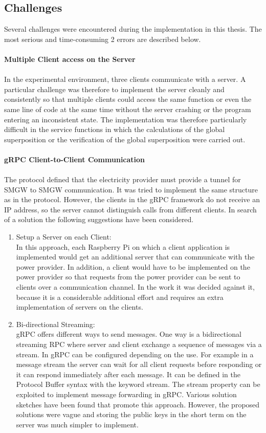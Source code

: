 \subsection{Challenges}
Several challenges were encountered during the implementation in this thesis. The most serious and time-consuming 2 errors are described below.\\
\\
\textbf{Multiple Client access on the Server}
\\
\\ 
In the experimental environment, three clients communicate with a server. A particular challenge was therefore to implement the server cleanly and consistently so that multiple clients could access the same function or even the same line of code at the same time without the server crashing or the program entering an inconsistent state. The implementation was therefore particularly difficult in the service functions in which the calculations of the global superposition or the verification of the global superposition were carried out.%
\\
\\
\textbf{gRPC Client-to-Client Communication}
\\
\\
The protocol defined that the electricity provider must provide a tunnel for SMGW to SMGW communication. It was tried to implement the same structure as in the protocol. However, the clients in the gRPC framework do not receive an IP address, so the server cannot distinguish calls from different clients. In search of a solution the following suggestions have been considered. 
\begin{enumerate}
\item Setup a Server on each Client:\\
In this approach, each Raspberry Pi on which a client application is implemented would get an additional server that can communicate with the power provider. In addition, a client would have to be implemented on the power provider so that requests from the power provider can be sent to clients over a communication channel. In the work it was decided against it, because it is a considerable additional effort and requires an extra implementation of servers on the clients.
\item Bi-directional Streaming:\\
gRPC offers different ways to send messages. One way is a bidirectional streaming RPC where server and client exchange a sequence of messages via a stream. In gRPC can be configured depending on the use.
For example in a message stream the server can wait for all client requests before responding or it can respond immediately after each message. It can be defined in the Protocol Buffer syntax with the keyword stream. The stream property can be exploited to implement message forwarding in gRPC. Various solution sketches have been found that promote this approach. However, the proposed solutions were vague and storing the public keys in the short term on the server was much simpler to implement. 
\end{enumerate}\\
